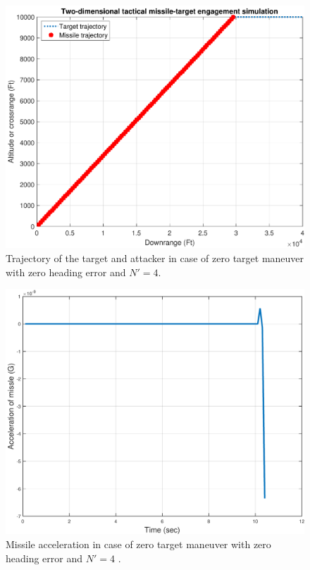 \begin{figure}[H]
	\centering
	\includegraphics[scale = 0.35]{fig/trajectoryXNT0HE0N4.pdf}
	\caption{Trajectory of the target and attacker in case of zero target maneuver with zero heading error and $N'=4$.}
	\label{trajectoryXNT0HE0N4}
\end{figure}


\begin{figure}[H]
	\centering
	\includegraphics[scale = 0.58]{fig/MissileAccelerationXNT0HE0N4.pdf}
	\caption{Missile acceleration in case of zero target maneuver with zero heading error and $N'=4$ .}
	\label{missile accelerationXNT0HE0N4}
\end{figure}


